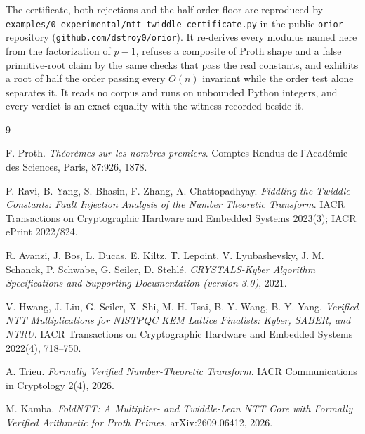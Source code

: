 \documentclass{article}
\begin{document}
The certificate, both rejections and the half-order floor are reproduced by \texttt{examples/0\_experimental/ntt\_twiddle\_certificate.py} in the public \texttt{orior} repository (\texttt{github.com/dstroy0/orior}). It re-derives every modulus named here from the factorization of \(p-1\), refuses a composite of Proth shape and a false primitive-root claim by the same checks that pass the real constants, and exhibits a root of half the order passing every \(O(n)\) invariant while the order test alone separates it. It reads no corpus and runs on unbounded Python integers, and every verdict is an exact equality with the witness recorded beside it.

\begin{thebibliography}{9}

F. Proth.
\emph{Th\'eor\`emes sur les nombres premiers}.
Comptes Rendus de l'Acad\'emie des Sciences, Paris, 87:926, 1878.

P. Ravi, B. Yang, S. Bhasin, F. Zhang, A. Chattopadhyay.
\emph{Fiddling the Twiddle Constants: Fault Injection Analysis of the Number Theoretic Transform}.
IACR Transactions on Cryptographic Hardware and Embedded Systems 2023(3); IACR ePrint 2022/824.

R. Avanzi, J. Bos, L. Ducas, E. Kiltz, T. Lepoint, V. Lyubashevsky, J. M. Schanck, P. Schwabe, G. Seiler, D. Stehl\'e.
\emph{CRYSTALS-Kyber Algorithm Specifications and Supporting Documentation (version 3.0)}, 2021.

V. Hwang, J. Liu, G. Seiler, X. Shi, M.-H. Tsai, B.-Y. Wang, B.-Y. Yang.
\emph{Verified NTT Multiplications for NISTPQC KEM Lattice Finalists: Kyber, SABER, and NTRU}.
IACR Transactions on Cryptographic Hardware and Embedded Systems 2022(4), 718--750.

A. Trieu.
\emph{Formally Verified Number-Theoretic Transform}.
IACR Communications in Cryptology 2(4), 2026.

M. Kamba.
\emph{FoldNTT: A Multiplier- and Twiddle-Lean NTT Core with Formally Verified Arithmetic for Proth Primes}.
arXiv:2609.06412, 2026.

\end{thebibliography}
\end{document}
